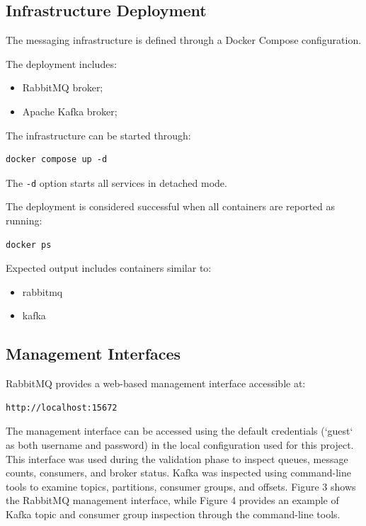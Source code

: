 \documentclass{scrartcl}
\begin{document}
\subsection{Infrastructure Deployment}

The messaging infrastructure is defined through a Docker Compose configuration.

The deployment includes:

\begin{itemize}
\item RabbitMQ broker;
\item Apache Kafka broker;
\end{itemize}

The infrastructure can be started through:

\begin{verbatim}
docker compose up -d
\end{verbatim}

The \texttt{-d} option starts all services in detached mode.

The deployment is considered successful when all containers are reported as running:

\begin{verbatim}
docker ps
\end{verbatim}

Expected output includes containers similar to:

\begin{itemize}
\item rabbitmq
\item kafka
\end{itemize}

\subsection{Management Interfaces}

RabbitMQ provides a web-based management interface accessible at:

\begin{verbatim}
http://localhost:15672
\end{verbatim}

The management interface can be accessed using the default credentials (`guest` as both username and password) in the local configuration used for this project.
This interface was used during the validation phase to inspect queues, message counts, consumers, and broker status. Kafka was inspected using command-line tools to examine topics, partitions, consumer groups, and offsets.
Figure 3 shows the RabbitMQ management
interface, while Figure 4 provides an
example of Kafka topic and consumer group inspection through the
command-line tools.
\end{document}
